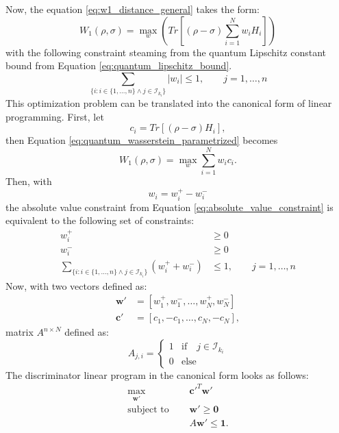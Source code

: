 Now, the equation \ref{eq:w1_distance_general} takes the form: 
\begin{equation}
  \label{eq:quantum_wasserstein_parametrized}
  W_1(\rho, \sigma) = \max_{w}{(Tr[(\rho - \sigma)\sum_{i=1}^N w_iH_i])}
\end{equation}
with the following constraint steaming from the quantum Lipschitz constant bound
from Equation \ref{eq:quantum_lipschitz_bound}.
\begin{equation}
  \label{eq:absolute_value_constraint}
\sum_{\{i: i \in \{1,\ldots, n\} \land j \in \mathcal{I}_{k_i} \}} |w_i| \leq 1, \qquad j=1,\ldots,n
\end{equation}
This optimization problem can be translated into the canonical form of linear
programming. First, let
\begin{equation}
  c_i=Tr[(\rho - \sigma)H_i],
\end{equation}  
  then Equation \ref{eq:quantum_wasserstein_parametrized} becomes
\begin{equation}
  W_1(\rho, \sigma) = \max_{w}{\sum_{i=1}^N w_ic_i}.
\end{equation}  
Then, with
\begin{equation}
    w_i = w_i^+ - w_i^-
\end{equation}
the absolute value constraint from Equation \ref{eq:absolute_value_constraint} is equivalent to the following set of
constraints: 
\begin{equation}
\begin{split}
  w_i^+ &\ge 0 \\
  w_i^- &\ge 0 \\
  \sum_{\{i: i \in \{1,\ldots, n\} \land j \in \mathcal{I}_{k_i} \}} (w_i^+ + w_i^-) &\leq 1, \qquad j=1,\ldots,n
\end{split}
\end{equation}
Now, with two vectors defined as:
\begin{equation}
\begin{split}
\bm{w'} &= [w_1^+, w_1^-, \ldots, w_N^+, w_N^-] \\
\bm{c'} &= [c_1, -c_1, \ldots, c_N, -c_N],
\end{split}
\end{equation}
matrix $A^{n \times N}$ defined as:
\[A_{j, i}  = \begin{cases} 
    1 & \text{if} \quad j \in \mathcal{I}_{k_i} \\
    0 & \text{else}
  \end{cases}
\]
The discriminator linear program in the canonical form looks as follows:
\begin{equation}
\begin{split}
  \max_{\bm{w'}}{} \quad & \bm{c'}^T \bm{w'}\\
  \text{subject to } \quad & \bm{w'} \geq \bm{0} \\
  & A\bm{w'} \leq \bm{1}.
\end{split}
\end{equation}

